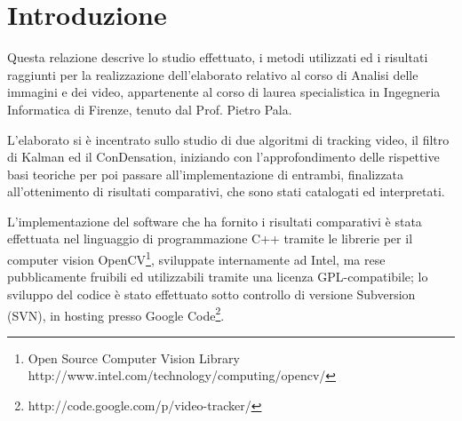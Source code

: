 \section{Introduzione}
Questa relazione descrive lo studio effettuato, i metodi utilizzati ed i risultati raggiunti per la realizzazione dell'elaborato relativo al corso di Analisi delle immagini e dei video, appartenente al corso di laurea specialistica in Ingegneria Informatica di Firenze, tenuto dal Prof. Pietro Pala.

L'elaborato si è incentrato sullo studio di due algoritmi di tracking video, il filtro di Kalman ed il ConDensation, iniziando con l'approfondimento delle rispettive basi teoriche per poi passare all'implementazione di entrambi, finalizzata all'ottenimento di risultati comparativi, che sono stati catalogati ed interpretati.

L'implementazione del software che ha fornito i risultati comparativi è stata effettuata nel linguaggio di programmazione C++ tramite le librerie per il computer vision OpenCV\footnote{Open Source Computer Vision Library http://www.intel.com/technology/computing/opencv/}, sviluppate internamente ad Intel, ma rese pubblicamente fruibili ed utilizzabili tramite una licenza GPL-compatibile; lo sviluppo del codice è stato effettuato sotto controllo di versione Subversion (SVN), in hosting presso Google Code\footnote{http://code.google.com/p/video-tracker/}.



